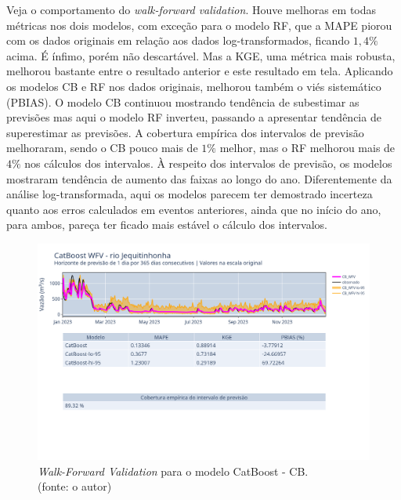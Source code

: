 Veja o comportamento do \textit{walk-forward validation}. Houve melhoras em todas métricas nos dois modelos, com exceção para o modelo RF, que a MAPE piorou com os dados originais em relação aos dados log-transformados, ficando $1,4\%$ acima. É ínfimo, porém não descartável. Mas a KGE, uma métrica mais robusta, melhorou bastante entre o resultado anterior e este resultado em tela. Aplicando os modelos CB e RF nos dados originais, melhorou também o viés sistemático (PBIAS). O modelo CB continuou mostrando tendência de subestimar as previsões mas aqui o modelo RF inverteu, passando a apresentar tendência de superestimar as previsões. A cobertura empírica dos intervalos de previsão melhoraram, sendo o CB pouco mais de $1\%$ melhor, mas o RF melhorou mais de $4\%$ nos cálculos dos intervalos. À respeito dos intervalos de previsão, os modelos mostraram tendência de aumento das faixas ao longo do ano. Diferentemente da análise log-transformada, aqui os modelos parecem ter demostrado incerteza quanto aos erros calculados em eventos anteriores, ainda que no início do ano, para ambos, pareça ter ficado mais estável o cálculo dos intervalos.

\begin{figure}[!h]
	\centering
	\includegraphics[scale=0.33]{Figuras/jequiti/wfv/CB/CB_WFV_ORIG.png}
	\caption{\textit{Walk-Forward Validation} para o modelo CatBoost - CB.\\(fonte: o autor)}
	\label{fig:jequiti_CB_WFV_ORIG}
\end{figure}

